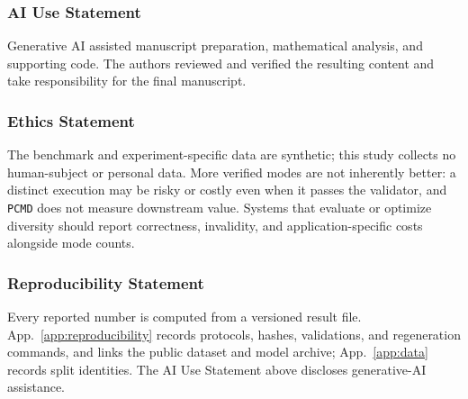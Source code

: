 \documentclass{article}
\newcommand{\1}{\mathbf 1}
\newcommand{\pmd}{\texttt{PCMD}}
\theoremstyle{remark}
\theoremstyle{definition}
\theoremstyle{plain}
\begin{document}
\subsubsection*{AI Use Statement}
\label{sec:ai-use}

Generative AI assisted manuscript preparation, mathematical analysis, and supporting code. The authors reviewed and verified the resulting content and take responsibility for the final manuscript.

\subsubsection*{Ethics Statement}

The benchmark and experiment-specific data are synthetic; this study collects
no human-subject or personal data. More verified modes are not inherently
better: a distinct execution may be risky or costly even when it passes the
validator, and \pmd{} does not measure downstream value. Systems
that evaluate or optimize diversity should report correctness, invalidity, and
application-specific costs alongside mode counts.

\subsubsection*{Reproducibility Statement}

Every reported number is computed from a versioned result file.
App.~\ref{app:reproducibility} records protocols, hashes, validations,
and regeneration commands, and links the public dataset and model archive;
App.~\ref{app:data} records split identities.
The AI Use Statement above discloses generative-AI assistance.



\clearpage
{}\label{sec:references}


\end{document}
